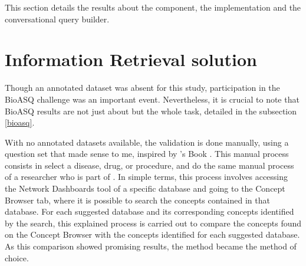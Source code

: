 This section details the results about the {\ir} component, the {\llm} implementation and the conversational query builder.


\section{Information Retrieval solution}



Though an annotated dataset was absent for this study, participation in the BioASQ challenge was an important event. Nevertheless, it is crucial to note that BioASQ results are not just about {\ir} but the whole task, detailed in the subsection \ref{bioasq}. 


With no annotated datasets available, the {\bm} validation is done manually, using a question set that made sense to me, inspired by {\ohdsi}'s Book \cite{informatics_book_nodate}. This manual process consists in select a disease, drug, or procedure, and do the same manual process of a researcher who is part of {\ehden}. In simple terms, this process involves accessing the Network Dashboards tool of a specific database and going to the Concept Browser tab, where it is possible to search the concepts contained in that database. For each suggested database and its corresponding concepts identified by the search, this explained process is carried out to compare the concepts found on the Concept Browser with the concepts identified for each suggested database. As this comparison showed promising results, the {\bm} method became the method of choice.



